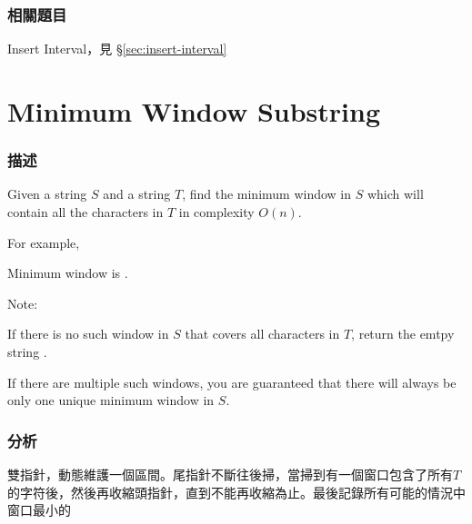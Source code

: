 \subsubsection{相關題目}

\begindot
\item Insert Interval，見 \S \ref{sec:insert-interval}
\myenddot


\section{Minimum Window Substring} %
\label{sec:minimum-window-substring}


\subsubsection{描述}
Given a string $S$ and a string $T$, find the minimum window in $S$ which will contain all the characters in $T$ in complexity $O(n)$.

For example, 

Minimum window is .

Note:
\begindot
\item If there is no such window in $S$ that covers all characters in $T$, return the emtpy string .
\item If there are multiple such windows, you are guaranteed that there will always be only one unique minimum window in $S$.
\myenddot


\subsubsection{分析}
雙指針，動態維護一個區間。尾指針不斷往後掃，當掃到有一個窗口包含了所有$T$的字符後，然後再收縮頭指針，直到不能再收縮為止。最後記錄所有可能的情況中窗口最小的



